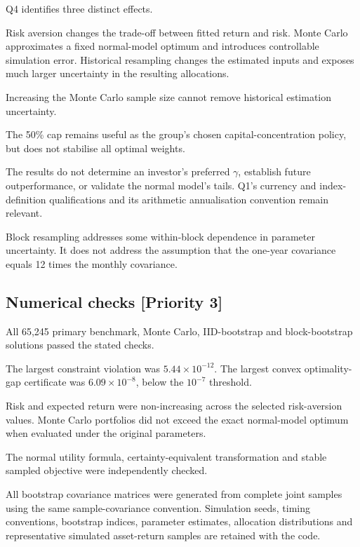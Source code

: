 \documentclass[
  10pt,
  a4paper,
]{article}
\begin{document}
Q4 identifies three distinct effects.

Risk aversion changes the trade-off between fitted return and risk.
Monte Carlo approximates a fixed normal-model optimum and introduces
controllable simulation error. Historical resampling changes the
estimated inputs and exposes much larger uncertainty in the resulting
allocations.

Increasing the Monte Carlo sample size cannot remove historical
estimation uncertainty.

The 50\% cap remains useful as the group's chosen capital-concentration
policy, but does not stabilise all optimal weights.

The results do not determine an investor's preferred \(\gamma\),
establish future outperformance, or validate the normal model's tails.
Q1's currency and index-definition qualifications and its arithmetic
annualisation convention remain relevant.

Block resampling addresses some within-block dependence in parameter
uncertainty. It does not address the assumption that the one-year
covariance equals 12 times the monthly covariance.

\hypertarget{numerical-checks-priority-3}{%
\subsection{Numerical checks {[}Priority
3{]}}\label{numerical-checks-priority-3}}

All 65,245 primary benchmark, Monte Carlo, IID-bootstrap and
block-bootstrap solutions passed the stated checks.

The largest constraint violation was \(5.44\times10^{-12}\). The largest
convex optimality-gap certificate was \(6.09\times10^{-8}\), below the
\(10^{-7}\) threshold.

Risk and expected return were non-increasing across the selected
risk-aversion values. Monte Carlo portfolios did not exceed the exact
normal-model optimum when evaluated under the original parameters.

The normal utility formula, certainty-equivalent transformation and
stable sampled objective were independently checked.

All bootstrap covariance matrices were generated from complete joint
samples using the same sample-covariance convention. Simulation seeds,
timing conventions, bootstrap indices, parameter estimates, allocation
distributions and representative simulated asset-return samples are
retained with the code.
\end{document}
